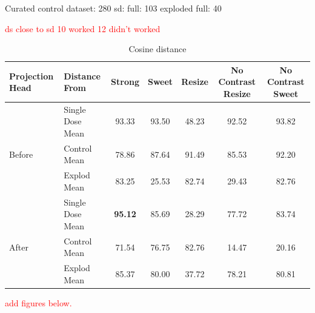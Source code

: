 Curated control dataset: 280
sd: full: 103
exploded full: 40

\textcolor{red}{ds close to sd 10 worked 12 didn't worked}



\begin{table}[H]
  \centering
  \begin{tabular}{@{}llccccc@{}}
  \toprule
  Projection Head & Distance From      & Strong & Sweet & Resize & No Contrast Resize & No Contrast Sweet \\ \midrule
                  & Single Dose Mean   & 93.33      & 93.50     & 48.23      & 92.52                  & 93.82                 \\
  Before          & Control Mean       & 78.86      & 87.64     & 91.49      & 85.53                  & 92.20                 \\
                  & Explod Mean        & 83.25      & 25.53     & 82.74      & 29.43                  & 82.76                 \\ \midrule
                  & Single Dose Mean   & \textbf{95.12}      & 85.69     & 28.29      & 77.72                  & 83.74                 \\
  After           & Control Mean       & 71.54      & 76.75     & 82.76      & 14.47                  & 20.16                 \\
                  & Explod Mean        & 85.37      & 80.00     & 37.72      & 78.21                  & 80.81                 \\ \bottomrule
  \end{tabular}
  \caption{Cosine distance}
  \label{tab:table_label}
\end{table}





\textcolor{red}{ add figures below. }

